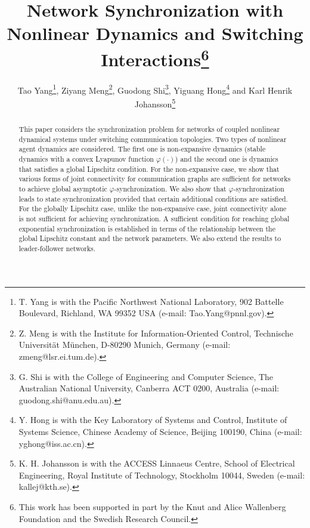 \documentclass[a4paper, 11pt]{article}
\begin{document}
\title{Network Synchronization  with Nonlinear Dynamics  and Switching Interactions\thanks{This work has been supported in part by the Knut and Alice Wallenberg Foundation and the Swedish Research
Council.}}
\date{}

\author{Tao Yang\thanks{T. Yang is with the Pacific Northwest National Laboratory, 902 Battelle Boulevard, Richland, WA 99352 USA (e-mail: Tao.Yang@pnnl.gov).}, Ziyang Meng\thanks{Z. Meng is with the Institute for Information-Oriented Control, Technische Universit\"{a}t M\"{u}nchen, D-80290 Munich, Germany (e-mail: zmeng@lsr.ei.tum.de).}, Guodong Shi\thanks{G. Shi is with the College of Engineering and Computer Science, The Australian National University, Canberra ACT 0200, Australia (e-mail: guodong.shi@anu.edu.au).}, Yiguang Hong\thanks{Y. Hong is with the Key Laboratory of Systems and Control, Institute of Systems Science, Chinese Academy of Science, Beijing 100190, China (e-mail: yghong@iss.ac.cn).} and Karl Henrik Johansson\thanks{K. H. Johansson is with the ACCESS Linnaeus Centre, School of Electrical Engineering, Royal Institute of Technology, Stockholm 10044, Sweden (e-mail: kallej@kth.se).}
}


\maketitle

\begin{abstract}
This paper considers the synchronization problem for networks of coupled nonlinear dynamical systems under switching communication topologies. Two types of nonlinear agent dynamics are considered.
The first one is non-expansive dynamics (stable dynamics with a convex Lyapunov function $\varphi(\cdot)$) and the second one is dynamics that satisfies a global Lipschitz condition.
For the non-expansive case, we show that various forms of joint connectivity for communication graphs are
sufficient for networks to achieve global asymptotic $\varphi$-synchronization.
We also show that $\varphi$-synchronization leads to state synchronization provided that certain additional conditions are satisfied.
For the globally Lipschitz case, unlike the non-expansive case, joint connectivity alone is not sufficient for achieving synchronization. A sufficient condition for reaching global exponential synchronization is established in terms of the relationship between the global Lipschitz constant and the network parameters. We also extend the results to leader-follower networks. 
\end{abstract}
\end{document}
